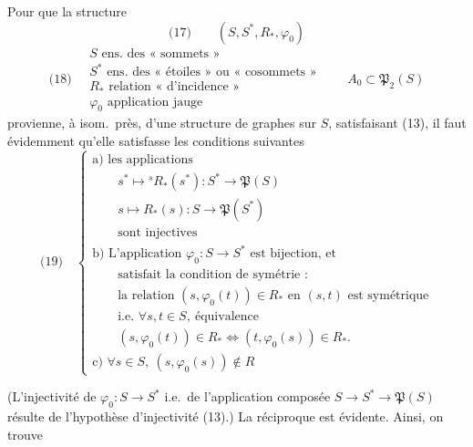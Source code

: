 \documentclass[11pt,a4paper]{article}
\begin{document}
Pour que la structure
\[
\text{(17)} \qquad (S, S^{*}, R_{*}, \varphi_0)
\]
\[
\text{(18)}\quad
\begin{array}{l}
S \text{ ens. des « sommets »}\\
S^{*} \text{ ens. des « étoiles » ou « cosommets »}\\
R_{*} \text{ relation « d'incidence »}\\
\varphi_0 \text{ application jauge}
\end{array}
\qquad A_0 \subset \mathfrak{P}_2(S)
\]
provienne, à isom.\ près, d'une structure de graphes sur $S$,
 satisfaisant (13), il faut évidemment qu'elle satisfasse
les conditions suivantes
\[
\text{(19)}\quad
\begin{cases}
\text{a) les applications}\\
\qquad s^{*} \longmapsto {}^{s}R_{*}(s^{*}) : S^{*} \longrightarrow \mathfrak{P}(S)\\
\qquad s \longmapsto R_{*}(s) : S \longrightarrow \mathfrak{P}(S^{*})\\
\qquad \text{sont injectives}\\
\text{b) L'application } \varphi_0 : S \longrightarrow S^{*} \text{ est bijection, et}\\
\qquad \text{satisfait la condition de symétrie :}\\
\qquad \text{la relation } (s, \varphi_0(t)) \in R_{*} \text{ en } (s,t) \text{ est symétrique}\\
\qquad \text{i.e. } \forall s,t \in S , \ \text{équivalence}\\
\qquad (s, \varphi_0(t)) \in R_{*} \iff (t, \varphi_0(s)) \in R_{*} .\\
\text{c) } \forall s \in S , \ (s, \varphi_0(s)) \notin R
\end{cases}
\]

(L'injectivité de $\varphi_0 : S \to S^{*}$ i.e.\ de l'application composée
$S \to S^{*} \to \mathfrak{P}(S)$ résulte de l'hypothèse d'injectivité (13).)
La réciproque est évidente.  Ainsi, on trouve
\end{document}
